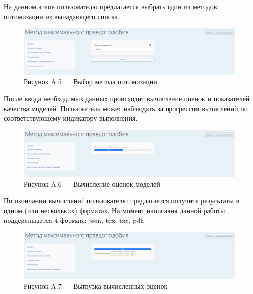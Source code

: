 На данном этапе пользователю предлагается выбрать один из методов оптимизации из выпадающего списка.

\begin{figure}[H]
    \begin{center}
        \includegraphics[width=1.0\linewidth]{src/img/screens/5.jpg}
        \caption*{Рисунок A.5 ~~ Выбор метода оптимизации}
        \label{fig:screen_5}
    \end{center}
\end{figure}

После ввода необходимых данных происходит вычисление оценок и показателей качества моделей. Пользователь может наблюдать за прогрессом вычислений по соответствующему индикатору выполнения.

\begin{figure}[H]
    \begin{center}
        \includegraphics[width=1.0\linewidth]{src/img/screens/6.jpg}
        \caption*{Рисунок A.6 ~~ Вычисление оценок моделей}
        \label{fig:screen_6}
    \end{center}
\end{figure}

По окончании вычислений пользователю предлагается получить результаты в одном (или нескольких) форматах. На момент написания данной работы поддерживается 4 формата: json, tex, txt, pdf.

\begin{figure}[H]
    \begin{center}
        \includegraphics[width=1.0\linewidth]{src/img/screens/7.jpg}
        \caption*{Рисунок A.7 ~~ Выгрузка вычисленных оценок}
        \label{fig:screen_7}
    \end{center}
\end{figure}


